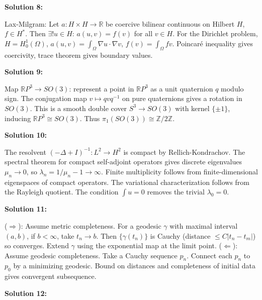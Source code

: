 \documentclass[12pt,a4paper]{exam}
\begin{document}
\vspace{0.5cm}

\textbf{Solution 8:}

Lax-Milgram: Let $a: H \times H \to \mathbb{R}$ be coercive bilinear continuous on Hilbert $H$, $f \in H^*$. Then $\exists! u \in H$: $a(u,v) = f(v)$ for all $v \in H$. For the Dirichlet problem, $H = H_0^1(\Omega)$, $a(u,v) = \int_\Omega \nabla u \cdot \nabla v$, $f(v) = \int_\Omega f v$. Poincar\'e inequality gives coercivity, trace theorem gives boundary values.

\vspace{0.5cm}

\textbf{Solution 9:}

Map $\mathbb{R}P^3 \to SO(3)$: represent a point in $\mathbb{R}P^3$ as a unit quaternion $q$ modulo sign. The conjugation map $v \mapsto q v q^{-1}$ on pure quaternions gives a rotation in $SO(3)$. This is a smooth double cover $S^3 \to SO(3)$ with kernel $\{\pm1\}$, inducing $\mathbb{R}P^3 \cong SO(3)$. Thus $\pi_1(SO(3)) \cong \mathbb{Z}/2\mathbb{Z}$.

\vspace{0.5cm}

\textbf{Solution 10:}

The resolvent $(-\Delta + I)^{-1}: L^2 \to H^2$ is compact by Rellich-Kondrachov. The spectral theorem for compact self-adjoint operators gives discrete eigenvalues $\mu_n \to 0$, so $\lambda_n = 1/\mu_n - 1 \to \infty$. Finite multiplicity follows from finite-dimensional eigenspaces of compact operators. The variational characterization follows from the Rayleigh quotient. The condition $\int u = 0$ removes the trivial $\lambda_0 = 0$.

\vspace{0.5cm}

\textbf{Solution 11:}

($\Rightarrow$): Assume metric completeness. For a geodesic $\gamma$ with maximal interval $(a,b)$, if $b < \infty$, take $t_n \to b$. Then $\{\gamma(t_n)\}$ is Cauchy (distance $\leq C|t_n - t_m|$) so converges. Extend $\gamma$ using the exponential map at the limit point. ($\Leftarrow$): Assume geodesic completeness. Take a Cauchy sequence $p_n$. Connect each $p_n$ to $p_0$ by a minimizing geodesic. Bound on distances and completeness of initial data gives convergent subsequence.

\vspace{0.5cm}

\textbf{Solution 12:}
\end{document}

